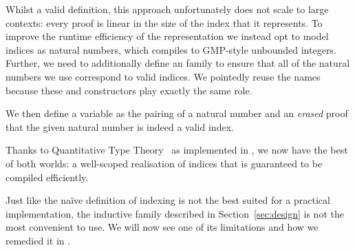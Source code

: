 Whilst a valid definition, this approach unfortunately does not scale to
large contexts:
%
every  proof is linear in the size of the \DeBruijn{}
index that it represents.
%
To improve the runtime efficiency of the representation we instead opt to
model \DeBruijn{} indices as natural numbers, which \Idris{} compiles to
GMP-style unbounded integers.
%
Further, we need to additionally define an  family to ensure that
all of the natural numbers we use correspond to valid indices.
%
We pointedly reuse the  names because these 
and  constructors play exactly the same role.


\noindent
We then define a variable as the pairing of a natural number and an \emph{erased}
proof that the given natural number is indeed a valid \DeBruijn{} index.


Thanks to Quantitative Type Theory~\cite{DBLP:conf/birthday/McBride16,DBLP:conf/lics/Atkey18}
as implemented in \Idris{},
we now have the best of both worlds: a well-scoped realisation of \DeBruijn{} indices
that is guaranteed to be compiled efficiently.


Just like the naïve definition of \DeBruijn{} indexing is not the
best suited for a practical implementation,
the inductive family  described in Section~\ref{sec:design}
is not the most convenient to use.
%
We will now see one of its limitations and how we remedied it in
\Velo{}.

